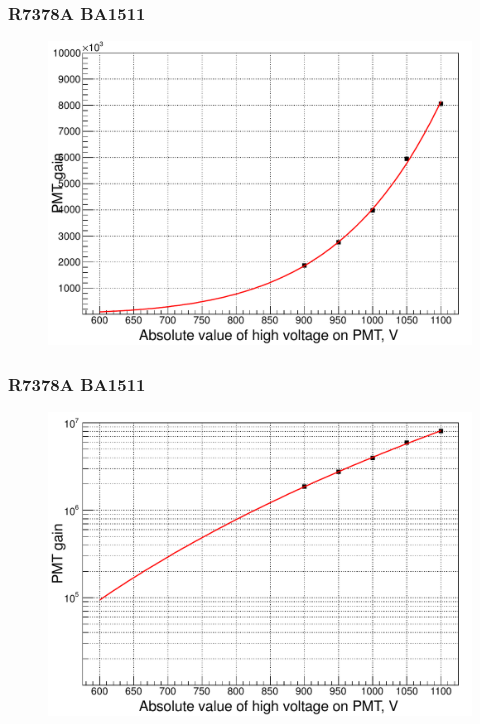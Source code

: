 \documentclass{beamer}
\begin{document}
%
%

\begin{frame}
\frametitle{R7378A BA1511}
\begin{figure}
  \includegraphics[width=0.95\linewidth]{./pmtGainR7378A_BA1511.pdf}
\end{figure}
\end{frame}
\begin{frame}
\frametitle{R7378A BA1511}
\begin{figure}
  \includegraphics[width=0.95\linewidth]{./pmtGainR7378A_BA1511_log.pdf}
\end{figure}
\end{frame}
\end{document}
